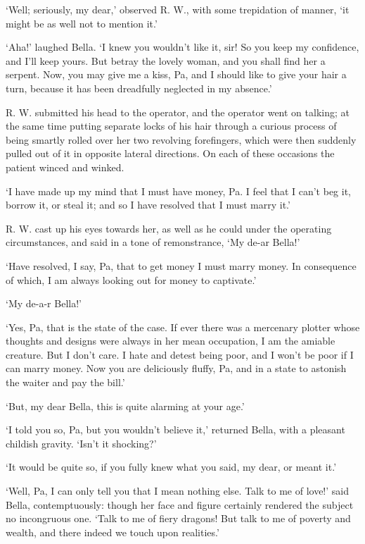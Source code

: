 ‘Well; seriously, my dear,’ observed R. W., with some trepidation of
manner, ‘it might be as well not to mention it.’

‘Aha!’ laughed Bella. ‘I knew you wouldn’t like it, sir! So you keep my
confidence, and I’ll keep yours. But betray the lovely woman, and you
shall find her a serpent. Now, you may give me a kiss, Pa, and I should
like to give your hair a turn, because it has been dreadfully neglected
in my absence.’

R. W. submitted his head to the operator, and the operator went on
talking; at the same time putting separate locks of his hair through
a curious process of being smartly rolled over her two revolving
forefingers, which were then suddenly pulled out of it in opposite
lateral directions. On each of these occasions the patient winced and
winked.

‘I have made up my mind that I must have money, Pa. I feel that I can’t
beg it, borrow it, or steal it; and so I have resolved that I must marry
it.’

R. W. cast up his eyes towards her, as well as he could under the
operating circumstances, and said in a tone of remonstrance, ‘My de-ar
Bella!’

‘Have resolved, I say, Pa, that to get money I must marry money. In
consequence of which, I am always looking out for money to captivate.’

‘My de-a-r Bella!’

‘Yes, Pa, that is the state of the case. If ever there was a mercenary
plotter whose thoughts and designs were always in her mean occupation, I
am the amiable creature. But I don’t care. I hate and detest being
poor, and I won’t be poor if I can marry money. Now you are deliciously
fluffy, Pa, and in a state to astonish the waiter and pay the bill.’

‘But, my dear Bella, this is quite alarming at your age.’

‘I told you so, Pa, but you wouldn’t believe it,’ returned Bella, with a
pleasant childish gravity. ‘Isn’t it shocking?’

‘It would be quite so, if you fully knew what you said, my dear, or
meant it.’

‘Well, Pa, I can only tell you that I mean nothing else. Talk to me of
love!’ said Bella, contemptuously: though her face and figure certainly
rendered the subject no incongruous one. ‘Talk to me of fiery dragons!
But talk to me of poverty and wealth, and there indeed we touch upon
realities.’


